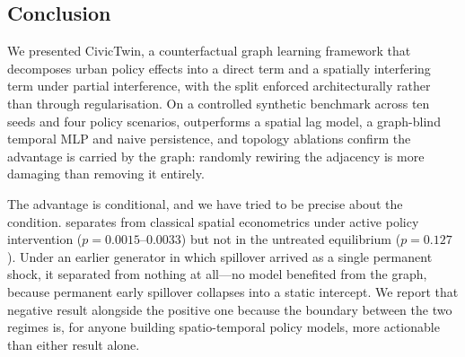 \subsection{Conclusion}

We presented CivicTwin, a counterfactual graph learning framework that
decomposes urban policy effects into a direct term and a spatially
interfering term under partial interference, with the split enforced
architecturally rather than through regularisation. On a controlled synthetic
benchmark across ten seeds and four policy scenarios, \CGCEN{} outperforms a
spatial lag model, a graph-blind temporal MLP and naive persistence, and
topology ablations confirm the advantage is carried by the graph: randomly
rewiring the adjacency is more damaging than removing it entirely.

The advantage is conditional, and we have tried to be precise about the
condition. \CGCEN{} separates from classical spatial econometrics under active
policy intervention ($p = 0.0015$--$0.0033$) but not in the untreated
equilibrium ($p = 0.127$). Under an earlier generator in which spillover
arrived as a single permanent shock, it separated from nothing at all---no
model benefited from the graph, because permanent early spillover collapses
into a static intercept. We report that negative result alongside the positive
one because the boundary between the two regimes is, for anyone building
spatio-temporal policy models, more actionable than either result alone.
